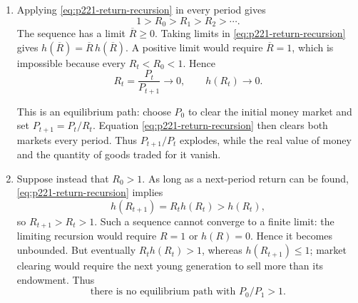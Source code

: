 \begin{solution}
\begin{enumerate}[label=(\alph*)]
    \item Applying \eqref{eq:p221-return-recursion} in every period gives
    \[
        1>R_0>R_1>R_2>\cdots.
    \]
    The sequence has a limit \(\overline R\ge0\). Taking limits in
    \eqref{eq:p221-return-recursion} gives
    \(h(\overline R)=\overline R\,h(\overline R)\). A positive limit would
    require \(\overline R=1\), which is impossible because every
    \(R_t<R_0<1\). Hence
    \[
        \boxed{R_t=\frac{P_t}{P_{t+1}}\longrightarrow0,
        \qquad h(R_t)\longrightarrow0.}
    \]

    This is an equilibrium path: choose \(P_0\) to clear the initial money
    market and set \(P_{t+1}=P_t/R_t\). Equation
    \eqref{eq:p221-return-recursion} then clears both markets every period.
    Thus \(P_{t+1}/P_t\) explodes, while the real value of money and the
    quantity of goods traded for it vanish.

    \item Suppose instead that \(R_0>1\). As long as a next-period return
    can be found, \eqref{eq:p221-return-recursion} implies
    \[
        h(R_{t+1})=R_t h(R_t)>h(R_t),
    \]
    so \(R_{t+1}>R_t>1\). Such a sequence cannot converge to a finite
    limit: the limiting recursion would require \(R=1\) or \(h(R)=0\).
    Hence it becomes unbounded. But eventually \(R_t h(R_t)>1\), whereas
    \(h(R_{t+1})\le1\); market clearing would require the next young
    generation to sell more than its endowment. Thus
    \[
        \boxed{\text{there is no equilibrium path with }P_0/P_1>1.}
    \]
\end{enumerate}
\end{solution}
